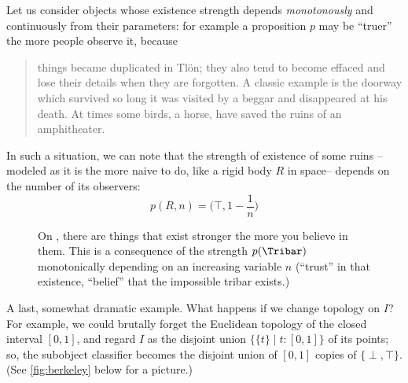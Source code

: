 \begin{example}\label{blu}
  Let us consider objects whose existence strength depends \emph{monotonously} and continuously from their parameters: for example a proposition $p$ may be ``truer'' the more people observe it, because
  \begin{quote}
    things became duplicated in Tlön; they also tend to become effaced and lose their details when they are forgotten. A classic example is the doorway which survived so long it was visited by a beggar and disappeared at his death. At times some birds, a horse, have saved the ruins of an amphitheater.  \hfill\cite{tlonEN}
  \end{quote}
  In such a situation, we can note that the strength of existence of some ruins --modeled as it is the more naive to do, like a rigid body $R$ in space-- depends on the number of its observers:
  \[\textstyle p(R, n) = \big(\top, 1-\frac{1}{n}\big)\]
  \begin{figure}[h]
    \begin{center}
    \end{center}
    \caption{On \tlon, there are things that exist stronger the more you believe in them. This is a consequence of the strength $p(\Tribar)$ monotonically depending on an increasing variable $n$ (``trust'' in that existence, ``belief'' that the impossible tribar \Tribar exists.)}
  \end{figure}
\end{example}
A last, somewhat dramatic example. What happens if we change topology on $I$? For example, we could brutally forget the Euclidean topology of the closed interval $[0,1]$, and regard $I$ as the disjoint union $\{ \{t\} \mid t: [0,1]\}$ of its points; so, the subobject classifier becomes the disjoint union of $[0,1]$ copies of $\{\perp,\top\}$. (See \autoref{fig:berkeley} below for a picture.)
